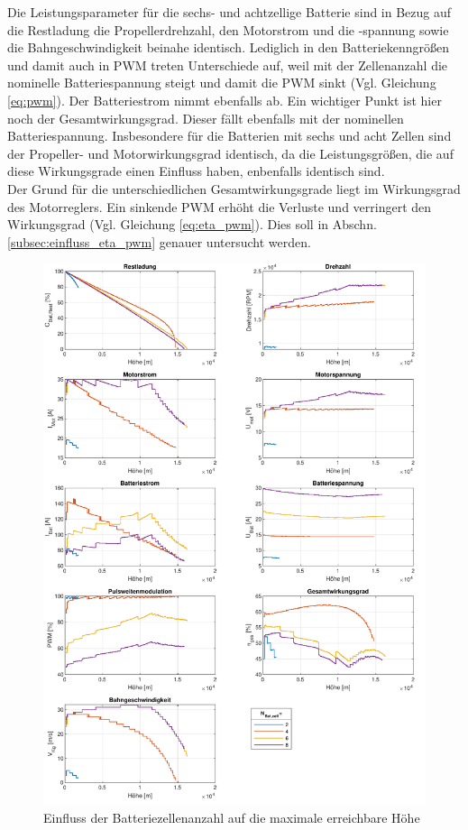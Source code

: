 Die Leistungsparameter für die sechs- und achtzellige Batterie sind in Bezug auf die Restladung die Propellerdrehzahl, den Motorstrom und die -spannung sowie die Bahngeschwindigkeit beinahe identisch. Lediglich in den Batteriekenngrößen und damit auch in PWM treten Unterschiede auf, weil mit der Zellenanzahl die nominelle Batteriespannung steigt und damit die PWM sinkt (Vgl. Gleichung \ref{eq:pwm}). Der Batteriestrom nimmt ebenfalls ab. 
Ein wichtiger Punkt ist hier noch der Gesamtwirkungsgrad. Dieser fällt ebenfalls mit der nominellen Batteriespannung. Insbesondere für die Batterien mit sechs und acht Zellen sind der Propeller- und Motorwirkungsgrad identisch, da die Leistungsgrößen, die auf diese Wirkungsgrade einen Einfluss haben, enbenfalls identisch sind. \\
Der Grund für die unterschiedlichen Gesamtwirkungsgrade liegt im Wirkungsgrad des Motorreglers. Ein sinkende PWM erhöht die Verluste und verringert den Wirkungsgrad (Vgl. Gleichung \ref{eq:eta_pwm}). Dies soll in Abschn. \ref{subsec:einfluss_eta_pwm} genauer untersucht werden.


\begin{figure}[H]
\centering
	\includegraphics[scale=0.70]{Diagramme/Untersuchung_N_Bat.pdf}
	\caption{Einfluss der Batteriezellenanzahl auf die maximale erreichbare Höhe}
	\label{abb:N_Bat_einfluss}
\end{figure}

